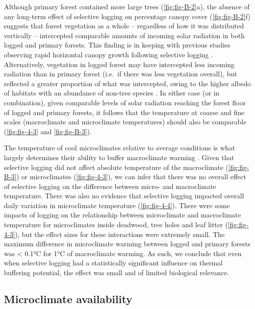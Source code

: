 \documentclass[12pt,a4paper,]{report}
\theoremstyle{definition}
\theoremstyle{definition}
\theoremstyle{definition}
\theoremstyle{remark}
\begin{document}
Although primary forest contained more large trees
(\autoref{fig:fig-B-2}a), the absence of any long-term effect of
selective logging on percentage canopy cover (\autoref{fig:fig-B-2}f)
suggests that forest vegetation as a whole -- regardless of how it was
distributed vertically -- intercepted comparable amounts of incoming
solar radiation in both logged and primary forests. This finding is in
keeping with previous studies observing rapid horizontal canopy growth
following selective logging \citep[e.g.][]{asner_canopy_2004}.
Alternatively, vegetation in logged forest may have intercepted less
incoming radiation than in primary forest (i.e.~if there was less
vegetation overall), but reflected a greater proportion of what was
intercepted, owing to the higher albedo of habitats with an abundance of
non-tree species
\citep{oke_boundary_1987, davin_climatic_2010, edwards_maintaining_2014}.
In either case (or in combination), given comparable levels of solar
radiation reaching the forest floor of logged and primary forests, it
follows that the temperature at coarse and fine scales (macroclimate and
microclimate temperatures) should also be comparable
(\autoref{fig:fig-4-3} and \autoref{fig:fig-B-3}).

The temperature of cool microclimates relative to average conditions is
what largely determines their ability to buffer macroclimate warming
\citep{scheffers_microhabitats_2014-1, gonzalez_del_pliego_thermally_2016, shi_framework_2016}.
Given that selective logging did not affect absolute temperature of the
macroclimate (\autoref{fig:fig-B-3}) or microclimates
(\autoref{fig:fig-4-3}), we can infer that there was no overall effect
of selective logging on the difference between micro- and macroclimate
temperature. There was also no evidence that selective logging impacted
overall daily variation in microclimate temperature
(\autoref{fig:fig-4-4}). There were some impacts of logging on the
relationship between microclimate and macroclimate temperature for
microclimates inside deadwood, tree holes and leaf litter
(\autoref{fig:fig-4-3}), but the effect sizes for these interactions
were extremely small. The maximum difference in microclimate warming
between logged and primary forests was \textless{} 0.1°C for 1°C of
macroclimate warming. As such, we conclude that even when selective
logging had a statistically significant influence on thermal buffering
potential, the effect was small and of limited biological relevance.

\subsection{Microclimate
availability}\label{microclimate-availability-1}
\end{document}
